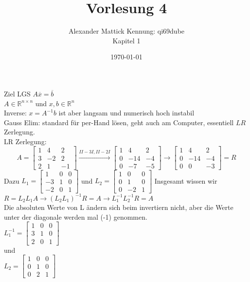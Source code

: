 \documentclass{article}
\author{
Alexander Mattick Kennung: qi69dube\\
Kapitel 1
}
\date{\today}
\title{Vorlesung 4}
\begin{document}
	\maketitle
	Ziel LGS $A\overline{x}=\overline{b}$\\
	$A\in\mathbb{R}^{n\times n}$ und $x,b\in\mathbb{R}^{n}$\\
	Inverse: $x = A^{-1}b$ ist aber langsam und numerisch hoch instabil\\
	Gauss Elim: standard für per-Hand lösen, geht auch am Computer, essentiell $LR$ Zerlegung.\\
	LR Zerlegung:\\
	$$A=\begin{bmatrix}1&4&2\\
		3&-2&2\\
		2&1&-1\end{bmatrix} \stackrel{II-3I, II-2I}{\to}
		\begin{bmatrix}1&4&2\\
		0&-14&-4\\
		0&-7&-5\end{bmatrix}\to
		\begin{bmatrix}1&4&2\\
		0&-14&-4\\
		0&0&-3\end{bmatrix}=R $$
		Dazu  $L_1=\begin{bmatrix}1&0&0\\
		-3&1&0\\
		-2&0&1\end{bmatrix}$ und $L_2 = \begin{bmatrix}1&0&0\\
		0&1&0\\
		0&-2&1\end{bmatrix}$
	Insgesamt wissen wir $R = L_2L_1A\to  (L_2L_1)^{-1} R = A\to L_1^{-1}L_2^{-1} R = A$\\
	Die absoluten Werte von L ändern sich beim invertiern nicht, aber die Werte unter der diagonale werden mal (-1) genommen.\\
	$L_1^{-1}=\begin{bmatrix}1&0&0\\
		3&1&0\\
		2&0&1\end{bmatrix}$\\
	und\\
	$L_2 = \begin{bmatrix}1&0&0\\
		0&1&0\\
		0&2&1\end{bmatrix}$
\end{document}
